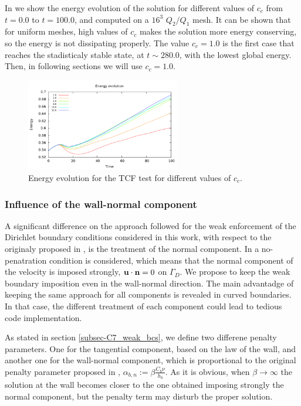 In  we show the energy evolution of the solution for different values of $ c_c $ from $ t=0.0 $ to $ t=100.0 $, and computed on a $ 16^3 $ $ Q_2/Q_1 $ mesh. It can be shown that for uniform meshes, high values of $ c_c $ makes the solution more energy conserving, so the energy is not dissipating properly. The value $ c_c=1.0 $ is the first case that reaches the stadisticaly stable state, at $ t\sim280.0 $, with the lowest global energy. Then, in following sections we will use $ c_c=1.0 $.
\begin{figure}[h!]
  \centering
  \includegraphics[width=0.6\textwidth]{Figures/Chapter7/TCF/ene_ktc}
  \caption{Energy evolution for the TCF test for different values of $ c_c $.}
  \label{fig-TCF_ene_ktc}
\end{figure}

\subsubsection{Influence of the wall-normal component}
\label{subsubsec-C7_TCF_wall_normal}
A significant difference on the approach followed for the weak enforcement of the Dirichlet boundary conditions considered in this work, with respect to the originaly proposed in \cite{bazilevs_weak_2007}, is the treatment of the normal component. In \cite{bazilevs_weak_2007} a no-penatration condition is considered, which means that the normal component of the velocity is imposed strongly, $ {\bf u}\cdot{\bf n}=0 $ on $ \Gamma_D $. We propose to keep the weak boundary imposition even in the wall-normal direction. The main advantadge of keeping the same approach for all components is revealed in curved boundaries. In that case, the different treatment of each component could lead to tedious code implementation.

As stated in section \ref{subsec-C7_weak_bcs}, we define two differene penalty parameters. One for the tangential component, based on the law of the wall, and another one for the wall-normal component, which is proportional to the original penalty parameter proposed in \cite{bazilevs_weak_2007-1}, $ \alpha_{b,n}:=\beta\frac{C_b\nu}{h_b} $. As it is obvious, when $ \beta\rightarrow\infty $ the solution at the wall becomes closer to the one obtained imposing strongly the normal component, but the penalty term may disturb the proper solution. 

